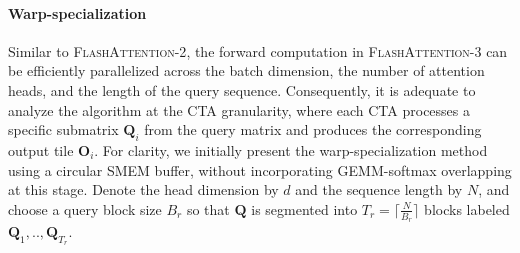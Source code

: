 \paragraph{Warp-specialization}
Similar to \textsc{FlashAttention-2}, the forward computation in \textsc{FlashAttention-3} can be efficiently parallelized across the batch dimension, the number of attention heads, and the length of the query sequence. Consequently, it is adequate to analyze the algorithm at the CTA granularity, where each CTA processes a specific submatrix $\mathbf{Q}_i$ from the query matrix and produces the corresponding output tile $\mathbf{O}_i$. For clarity, we initially present the warp-specialization method using a circular SMEM buffer, without incorporating GEMM-softmax overlapping at this stage. Denote the head dimension by $d$ and the sequence length by $N$, and choose a query block size $B_r$ so that $\mathbf{Q}$ is segmented into $T_r = \lceil \frac{N}{B_r} \rceil$ blocks labeled $\mathbf{Q}_1, .., \mathbf{Q}_{T_r}$.

